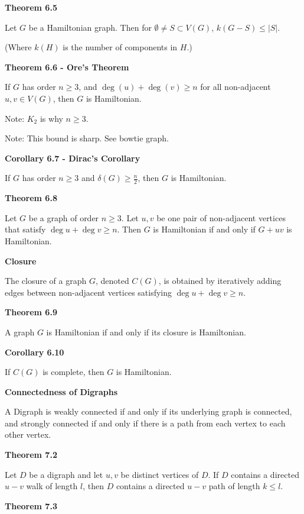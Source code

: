 \documentclass{article}
\begin{document}
\medskip\noindent\textbf{Theorem 6.5}

    Let $G$ be a Hamiltonian graph. Then for $\emptyset \neq S \subset V(G)$, $k(G-S) \leq |S|$.

    (Where $k(H)$ is the number of components in $H$.)

\medskip\noindent\textbf{Theorem 6.6 - Ore's Theorem}

    If $G$ has order $n \geq 3$, and $\deg(u) + \deg(v) \geq n$ for all non-adjacent $u,v \in V(G)$, then $G$ is Hamiltonian.

    Note: $K_2$ is why $n \geq 3$.

    Note: This bound is sharp. See bowtie graph.

\medskip\noindent\textbf{Corollary 6.7 - Dirac's Corollary}

    If $G$ has order $n \geq 3$ and $\delta(G) \geq \frac n2$, then $G$ is Hamiltonian.

\medskip\noindent\textbf{Theorem 6.8}

    Let $G$ be a graph of order $n \geq 3$. Let $u,v$ be one pair of non-adjacent vertices that satisfy $\deg u + \deg v \geq n$. Then $G$ is Hamiltonian if and only if $G+uv$ is Hamiltonian.

\medskip\noindent\textbf{Closure}

    The closure of a graph $G$, denoted $C(G)$, is obtained by iteratively adding edges between non-adjacent vertices satisfying $\deg u + \deg  v \geq n$.

\medskip\noindent\textbf{Theorem 6.9}

    A graph $G$ is Hamiltonian if and only if its closure is Hamiltonian.

\medskip\noindent\textbf{Corollary 6.10}

    If $C(G)$ is complete, then $G$ is Hamiltonian.

\medskip\noindent\textbf{Connectedness of Digraphs}

    A Digraph is weakly connected if and only if its underlying graph is connected, and strongly connected if and only if there is a path from each vertex to each other vertex.

\medskip\noindent\textbf{Theorem 7.2}

    Let $D$ be a digraph and let $u,v$ be distinct vertices of $D$.
    If $D$ contains a directed $u-v$ walk of length $l$, then $D$ contains a directed $u-v$ path of length $k \leq l$.

\medskip\noindent\textbf{Theorem 7.3}
\end{document}
